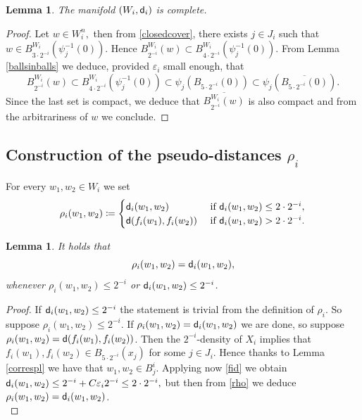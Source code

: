 \documentclass[11pt]{article}
\newcommand{\eps}{\varepsilon}
\newcommand{\sfd}{{\sf d}}
\theoremstyle{plain}
\newtheorem{lemma}[theorem]{Lemma}
\theoremstyle{definition}
\numberwithin{equation}{section}
\begin{document}
\begin{lemma}\label{lem:complete manifolds}
	The manifold $(W_i,\sfd_i)$ is complete.
\end{lemma}
\begin{proof}
	Let $w \in W_{i}^n,$ then from \eqref{closedcover}, there exists $j \in J_i$ such that
	$w \in B^{W_i}_{3\cdot 2^{-i}}(\psi_{j}^{-1}(0)).$ Hence $B^{W_i}_{2^{-i}}(w) \subset B^{W_i}_{4\cdot 2^{-i}}(\psi_{j}^{-1}(0)) $.  From Lemma \ref{ballsinballs} we  deduce, provided $\eps_i$ small enough, that $$B^{W_i}_{2^{-i}}(w)\subset B^{W_i}_{4\cdot 2^{-i}}(\psi_{j}^{-1}(0)) \subset \psi_{j}(B_{5\cdot 2^{-i}}(0))\subset \psi_{j}\left (\overline{B_{5\cdot 2^{-i}}(0)}\right ).$$ Since the last set is compact, we deduce that  $\overline{B^{W_i}_{2^{-i}}(w)}$ is also compact and from the arbitrariness of $w$ we conclude.
\end{proof}


\subsection{Construction of the pseudo-distances \texorpdfstring{$\rho_i$}{rho-i} }\label{sec:pseudo}


For every $w_1,w_2 \in W_i$ we set
\begin{equation}\label{rho}
	\rho_i(w_1,w_2)\coloneqq  \begin{cases}
		\sfd_i(w_1,w_2) & \text{ if } \sfd_i(w_1,w_2)\le 2\cdot 2^{-i},\\
		\sfd(f_i(w_1),f_i(w_2)) & \text{ if } \sfd_i(w_1,w_2)> 2\cdot 2^{-i}.\\
	\end{cases}
\end{equation}

\begin{lemma}\label{rhod}
	It holds that
	$$\rho_i(w_1,w_2)=\sfd_i(w_1,w_2),$$
	whenever $\rho_i(w_1,w_2)\le 2^{-i}$ or $\sfd_i(w_1,w_2)\le 2^{-i}$.
\end{lemma}
\begin{proof}
	If $\sfd_i(w_1,w_2)\le 2^{-i}$ the statement is trivial from the definition of $\rho_i$. So suppose $\rho_i(w_1,w_2)\le 2^{-i}$. If $\rho_i(w_1,w_2)=\sfd_i(w_1,w_2)$ we are done, so suppose $\rho_i(w_1,w_2)=\sfd(f_i(w_1),f_i(w_2)) $. Then the $2^{-i}$-density of $X_i$ implies that $f_i(w_1),f_i(w_2) \in B_{5\cdot 2^{-i}}(x_j)$ for some $j \in J_i.$ Hence thanks to Lemma \ref{correspl} we have that $w_1,w_2 \in B_j^i.$ Applying now \eqref{fid} we obtain $\sfd_i(w_1,w_2)\le 2^{-i}+C\eps_i 2^{-i}\le 2\cdot 2^{-i},$ but then from \eqref{rho} we deduce $\rho_i(w_1,w_2)=\sfd_i(w_1,w_2)$.\\		
\end{proof}	 
\end{document}
